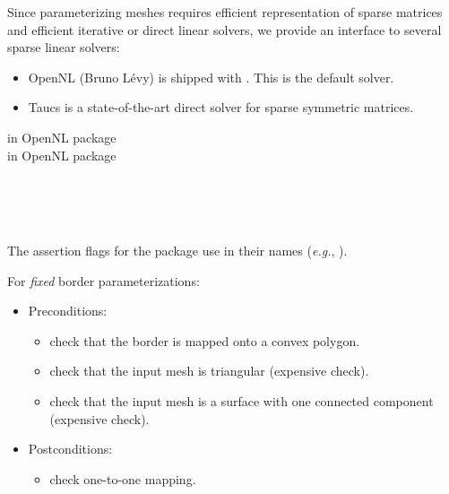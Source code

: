 
Since parameterizing meshes requires
efficient representation of sparse matrices and efficient iterative or
direct linear solvers, we provide an interface to several
sparse linear solvers:
\begin{itemize}
\item OpenNL (Bruno L{\'e}vy) is shipped with \cgal. This is the default solver.
\item {\sc Taucs} is a state-of-the-art direct solver for sparse symmetric matrices.
\end{itemize}

 in OpenNL package  \\
 in OpenNL package  \\
  \\
  \\



  \\



The assertion flags for the package
use  in their names (\textit{e.g.},
).

For \emph{fixed} border parameterizations:
\begin{itemize}
\item Preconditions:
    \begin{itemize}
    \item check that the border is mapped onto a convex polygon.
    \item check that the input mesh is triangular (expensive check).
    \item check that the input mesh is a surface with one connected component (expensive check).
    \end{itemize}
\item Postconditions:
    \begin{itemize}
    \item check one-to-one mapping.
    \end{itemize}
\end{itemize}


